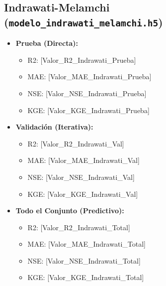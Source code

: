 \documentclass[12pt]{article}
\begin{document}
\subsection*{Indrawati-Melamchi (\texttt{modelo\_indrawati\_melamchi.h5})}
\begin{itemize}
    \item \textbf{Prueba (Directa):}
    \begin{itemize}
        \item R2: [Valor\_R2\_Indrawati\_Prueba]
        \item MAE: [Valor\_MAE\_Indrawati\_Prueba]
        \item NSE: [Valor\_NSE\_Indrawati\_Prueba]
        \item KGE: [Valor\_KGE\_Indrawati\_Prueba]
    \end{itemize}
    \item \textbf{Validación (Iterativa):}
    \begin{itemize}
        \item R2: [Valor\_R2\_Indrawati\_Val]
        \item MAE: [Valor\_MAE\_Indrawati\_Val]
        \item NSE: [Valor\_NSE\_Indrawati\_Val]
        \item KGE: [Valor\_KGE\_Indrawati\_Val]
    \end{itemize}
    \item \textbf{Todo el Conjunto (Predictivo):}
    \begin{itemize}
        \item R2: [Valor\_R2\_Indrawati\_Total]
        \item MAE: [Valor\_MAE\_Indrawati\_Total]
        \item NSE: [Valor\_NSE\_Indrawati\_Total]
        \item KGE: [Valor\_KGE\_Indrawati\_Total]
    \end{itemize}
\end{itemize}
\end{document}
